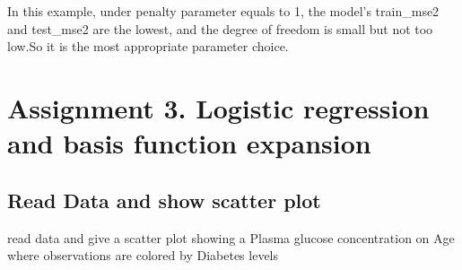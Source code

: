 \documentclass[
]{article}
\newenvironment{Shaded}{\begin{snugshade}}{\end{snugshade}}
\newcommand{\AttributeTok}[1]{\textcolor[rgb]{0.13,0.29,0.53}{#1}}
\newcommand{\CommentTok}[1]{\textcolor[rgb]{0.56,0.35,0.01}{\textit{#1}}}
\newcommand{\ConstantTok}[1]{\textcolor[rgb]{0.56,0.35,0.01}{#1}}
\newcommand{\FunctionTok}[1]{\textcolor[rgb]{0.13,0.29,0.53}{\textbf{#1}}}
\newcommand{\NormalTok}[1]{#1}
\newcommand{\OtherTok}[1]{\textcolor[rgb]{0.56,0.35,0.01}{#1}}
\newcommand{\SpecialCharTok}[1]{\textcolor[rgb]{0.81,0.36,0.00}{\textbf{#1}}}
\newcommand{\StringTok}[1]{\textcolor[rgb]{0.31,0.60,0.02}{#1}}
\begin{document}
In this example, under penalty parameter equals to 1, the model's
train\_mse2 and test\_mse2 are the lowest, and the degree of freedom is
small but not too low.So it is the most appropriate parameter choice.

\section{Assignment 3. Logistic regression and basis function
expansion}\label{assignment-3.-logistic-regression-and-basis-function-expansion}

\subsection{Read Data and show scatter
plot}\label{read-data-and-show-scatter-plot}

read data and give a scatter plot showing a Plasma glucose concentration
on Age where observations are colored by Diabetes levels

\begin{Shaded}
\end{Shaded}
\end{document}
